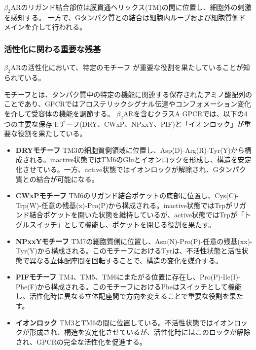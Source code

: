 $\beta_2$ARのリガンド結合部位は膜貫通ヘリックス(TM)の間に位置し、細胞外の刺激を感知する。
一方で、Gタンパク質との結合は細胞内ループおよび細胞質側ドメインを介して行われる。


\subsubsection{活性化に関わる重要な残基}
$\beta_2$ARの活性化において、特定のモチーフ\cite{nygaard2009ligand}\cite{lee2013mapping}
が重要な役割を果たしていることが知られている。

モチーフとは、タンパク質中の特定の機能に関連する保存されたアミノ酸配列のことであり、GPCRではアロステリックシグナル伝達やコンフォメーション変化を介して受容体の機能を調節する。
$\beta_2$ARを含むクラスA GPCRでは、以下の4つの主要な保存モチーフ(DRY、CWxP、NPxxY、PIF)と「イオンロック」が重要な役割を果たしている。

\begin{itemize}
  \item \textbf{DRYモチーフ}  
  TM3の細胞質側領域に位置し、Asp(D)-Arg(R)-Tyr(Y)から構成される。inactive状態ではTM6のGluとイオンロックを形成し、構造を安定化させている。一方、active状態ではイオンロックが解除され、Gタンパク質との結合が可能になる。

  \item \textbf{CWxPモチーフ}  
  TM6のリガンド結合ポケットの底部に位置し、Cys(C)-Trp(W)-任意の残基(x)-Pro(P)から構成される。inactive状態ではTrpがリガンド結合ポケットを開いた状態を維持しているが、active状態ではTrpが「トグルスイッチ」として機能し、ポケットを閉じる役割を果たす。

  \item \textbf{NPxxYモチーフ}  
  TM7の細胞質側に位置し、Asn(N)-Pro(P)-任意の残基(xx)-Tyr(Y)から構成される。このモチーフにおけるTyrは、不活性状態と活性状態で異なる立体配座間を回転することで、構造の変化を媒介する。

  \item \textbf{PIFモチーフ}  
  TM4、TM5、TM6にまたがる位置に存在し、Pro(P)-Ile(I)-Phe(F)から構成される。このモチーフにおけるPheはスイッチとして機能し、活性化時に異なる立体配座間で方向を変えることで重要な役割を果たす。

  \item \textbf{イオンロック}  
  TM3とTM6の間に位置している。不活性状態ではイオンロックが形成され、構造を安定化させているが、活性化時にはこのロックが解除され、GPCRの完全な活性化を促進する。
\end{itemize}

